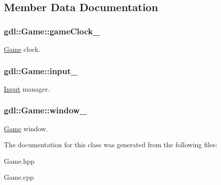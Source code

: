 \subsection{Member Data Documentation}
\hypertarget{classgdl_1_1Game_a1cc7814ce34e89d8c09e6648640c5da8}{
\subsubsection[{gameClock\_\-}]{ {\bf gdl::Game::gameClock\_\-}}}
\label{classgdl_1_1Game_a1cc7814ce34e89d8c09e6648640c5da8}
\hyperlink{classgdl_1_1Game}{Game} clock. \hypertarget{classgdl_1_1Game_a43591b031a6f20da0cf41123efb8a26b}{
\subsubsection[{input\_\-}]{ {\bf gdl::Game::input\_\-}}}
\label{classgdl_1_1Game_a43591b031a6f20da0cf41123efb8a26b}
\hyperlink{classgdl_1_1Input}{Input} manager. \hypertarget{classgdl_1_1Game_a0ff1750e43b4d276f64b25876b079bb4}{
\subsubsection[{window\_\-}]{ {\bf gdl::Game::window\_\-}}}
\label{classgdl_1_1Game_a0ff1750e43b4d276f64b25876b079bb4}
\hyperlink{classgdl_1_1Game}{Game} window. 

The documentation for this class was generated from the following files:\begin{DoxyCompactItemize}
\item 
Game.hpp\item 
Game.cpp\end{DoxyCompactItemize}
